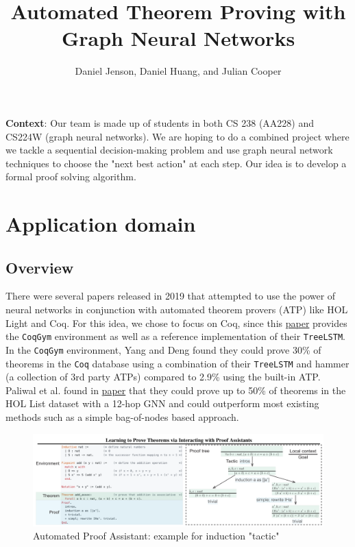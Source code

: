 \documentclass{article}
\title{Automated Theorem Proving with Graph Neural Networks} %
\author{Daniel Jenson, Daniel Huang, and Julian Cooper}
\begin{document}
\maketitle


\textbf{Context}: Our team is made up of students in both CS 238 (AA228) and
CS224W (graph neural networks). We are hoping to do a combined project where we
tackle a sequential decision-making problem and use graph neural network
techniques to choose the "next best action" at each step. Our idea is to 
develop a formal proof solving algorithm.  

\section{Application domain}
\subsection{Overview}
There were several papers released in 2019 that attempted to use the power of
neural networks in conjunction with automated theorem provers (ATP) like HOL
Light and Coq. For this idea, we chose to focus on Coq, since this
\href{https://arxiv.org/abs/1905.09381}{paper} provides the
\texttt{CoqGym} environment as well as a reference implementation of their
\texttt{TreeLSTM}. In the \texttt{CoqGym} environment, Yang and Deng found they
could prove 30\% of theorems in the \texttt{Coq} database using a combination of their \texttt{TreeLSTM} and
hammer (a collection of 3rd party ATPs) compared to 2.9\% using the built-in
ATP.  Paliwal et al. found in \href{https://arxiv.org/abs/1905.10006}{paper}
that they could prove up to 50\% of theorems in the HOL List dataset with a
12-hop GNN and could outperform most existing methods such as a simple
bag-of-nodes based approach.

\begin{figure}[h]
    \centering
    \includegraphics[width=1\textwidth]{images/proof_assistant_example.png}
    \caption{Automated Proof Assistant: example for induction "tactic" \cite{coqgym}}
    \label{fig:atp}
\end{figure}
\end{document}

